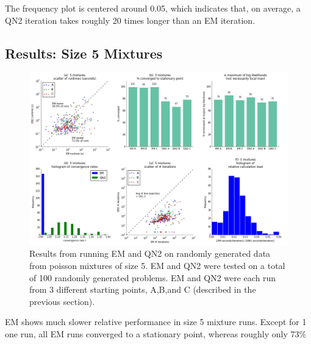 \documentclass[letter,12pt]{article}
\begin{document}
The frequency plot is centered around 0.05, which indicates that, on average, a QN2 iteration takes roughly 20 times longer than an EM iteration.

\pagebreak
\subsection{Results: Size 5 Mixtures}

\begin{figure}[h]
\centering
\includegraphics[width=16cm]{fig_RunData2_K5_init3.png}
\caption{Results from running EM and QN2 on randomly generated data from poisson mixtures of size 5.  EM and QN2 were tested on a total of 100 randomly generated problems.  EM and QN2 were each run from 3 different starting points, A,B,and C (described in the previous section).}
\end{figure}

EM shows much slower relative performance in size 5 mixture runs.  Except for 1 one run, all EM runs converged to a stationary point, whereas roughly only 73\% 



\pagebreak


\end{document}
